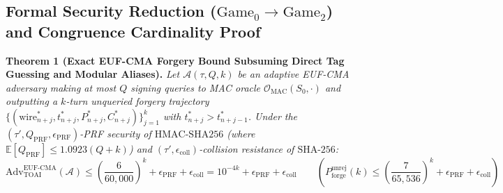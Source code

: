 \documentclass[9pt,a4paper]{extarticle}
\begin{document}
\subsection{Formal Security Reduction ($\text{Game}_0 \rightarrow \text{Game}_2$) and Congruence Cardinality Proof}
\textbf{Theorem 1 (Exact EUF-CMA Forgery Bound Subsuming Direct Tag Guessing and Modular Aliases).} \emph{Let $\mathcal{A}(\tau, Q, k)$ be an adaptive EUF-CMA adversary making at most $Q$ signing queries to MAC oracle $\mathcal{O}_{\text{MAC}}(S_0, \cdot)$ and outputting a $k$-turn unqueried forgery trajectory $\{( \text{wire}_{n+j}^*, t_{n+j}^*, P_{n+j}^*, C_{n+j}^* )\}_{j=1}^k$ with $t_{n+j}^* > t_{n+j-1}^*$. Under the $(\tau', Q_{\text{PRF}}, \epsilon_{\text{PRF}})$-PRF security of $\text{HMAC-SHA256}$ (where $\mathbb{E}[Q_{\text{PRF}}] \le 1.0923(Q+k)$) and $(\tau', \epsilon_{\text{coll}})$-collision resistance of $\text{SHA-256}$:}
\begin{equation}
  \text{Adv}_{\text{TOAI}}^{\text{EUF-CMA}}(\mathcal{A}) \le \left(\frac{6}{60{,}000}\right)^k + \epsilon_{\text{PRF}} + \epsilon_{\text{coll}} = 10^{-4k} + \epsilon_{\text{PRF}} + \epsilon_{\text{coll}} \qquad \left(P_{\text{forge}}^{\text{unrej}}(k) \le \left(\frac{7}{65{,}536}\right)^k + \epsilon_{\text{PRF}} + \epsilon_{\text{coll}}\right)
  \label{eq:forgery_bound}
\end{equation}
\end{document}
